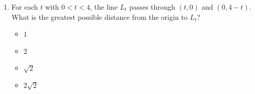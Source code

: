 \documentclass[11pt,a4paper]{article}
\begin{document}
\begin{enumerate}
\item For each $t$ with $0<t<4$, the line $L_t$ passes through $(t,0)$ and $(0,4-t)$. What is the greatest possible distance from the origin to $L_t$?
\begin{itemize}
\item[A)] $1$
\item[B)] $2$
\item[C)] $\sqrt2$
\item[D)] $2\sqrt2$
\end{itemize}

\end{enumerate}

\end{document}
